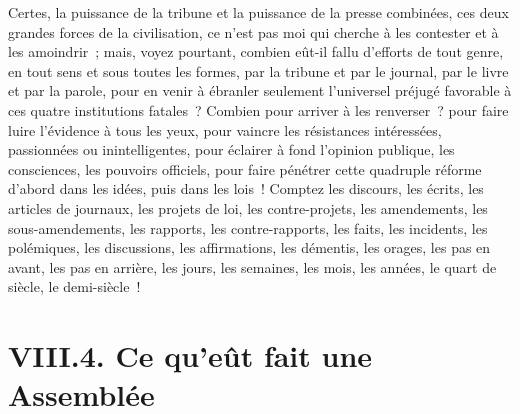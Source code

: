 \documentclass[french,twoside]{book} %
\begin{document}
Certes, la puissance de la tribune et la puissance de la presse combinées, ces deux grandes forces de la civilisation, ce n’est pas moi qui cherche à les contester et à les amoindrir ; mais, voyez pourtant, combien eût-il fallu d’efforts de tout genre, en tout sens et sous toutes les formes, par la tribune et par le journal, par le livre et par la parole, pour en venir à ébranler seulement l’universel préjugé favorable à ces quatre institutions fatales ? Combien pour arriver à les renverser ? pour faire luire l’évidence à tous les yeux, pour vaincre les résistances intéressées, passionnées ou inintelligentes, pour éclairer à fond l’opinion publique, les consciences, les pouvoirs officiels, pour faire pénétrer cette quadruple réforme d’abord dans les idées, puis dans les lois ! Comptez les discours, les écrits, les articles de journaux, les projets de loi, les contre-projets, les amendements, les sous-amendements, les rapports, les contre-rapports, les faits, les incidents, les polémiques, les discussions, les affirmations, les démentis, les orages, les pas en avant, les pas en arrière, les jours, les semaines, les mois, les années, le quart de siècle, le demi-siècle !

\section[{VIII.4. Ce qu’eût fait une Assemblée}]{VIII.4. Ce qu’eût fait une Assemblée}
\end{document}

